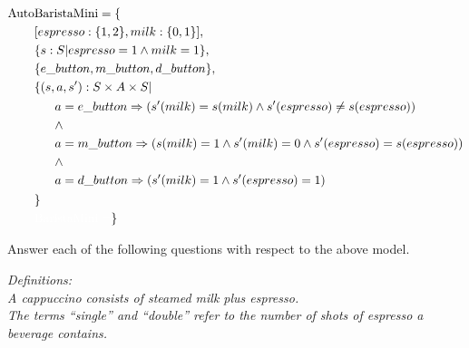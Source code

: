 \documentclass[12pt,fleqn]{article}
\begin{document}
\begin{equation*}\begin{split}
\mathrm{Auto}&\mathrm{BaristaMini} = \{\\
&[ espresso : \{ 1, 2 \}, milk : \{ 0, 1 \} ],\\
&\{ s: S | espresso = 1 \wedge milk = 1 \},\\
&\{ e\_button, m\_button, d\_button\},\\
&\{(s,a,s'): S\times A\times S | \\
&\begin{split}
~~~~~&a = e\_button \Rightarrow (s'(milk)=s(milk) \wedge s'(espresso)\neq s(espresso) )\\
&\wedge\\
&a = m\_button \Rightarrow (s(milk)=1 \wedge s'(milk)=0 \wedge s'(espresso)=s(espresso))\\
&\wedge\\
&a = d\_button \Rightarrow (s'(milk)=1 \wedge s'(espresso)=1)
\end{split}\\
&\}\\
&\color{white}\mathrm{BaristaMini} = \color{black}\}
\end{split}\end{equation*}

Answer each of the following questions with respect to the above model.

\vspace*{2ex}

{\em Definitions:\\[2ex]
A cappuccino consists of steamed milk plus espresso.\\[1ex]
The terms ``single'' and ``double'' refer to the number of shots of espresso a beverage contains.}

\clearpage
\end{document}
